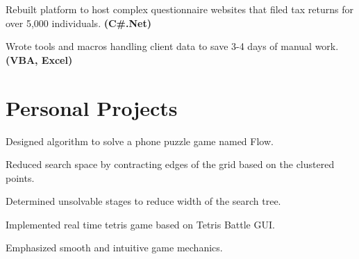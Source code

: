 \documentclass[letterpaper]{kevin-resume} %
\begin{document}
\begin{minipage}[t]{0.63\textwidth}
\sectionspace %


\begin{tightitemize}
	\item Rebuilt platform to host complex questionnaire websites that filed tax returns for over 5,000 individuals. \textbf{(C\#.Net)}
	\item Wrote tools and macros handling client data to save 3-4 days of manual work. \textbf{(VBA, Excel)}
\end{tightitemize}

\sectionspace %


\sectionspace %

\section{Personal Projects}

\begin{tightitemize}
	\item Designed algorithm to solve a phone puzzle game named Flow.
 	\item Reduced search space by contracting edges of the grid based on the clustered points.
 	\item Determined unsolvable stages to reduce width of the search tree.
\end{tightitemize}

\sectionspace %


\begin{tightitemize}
	\item Implemented real time tetris game based on Tetris Battle GUI.
	\item Emphasized smooth and intuitive game mechanics.
\end{tightitemize}

\sectionspace %


\end{minipage} %
\end{document}

